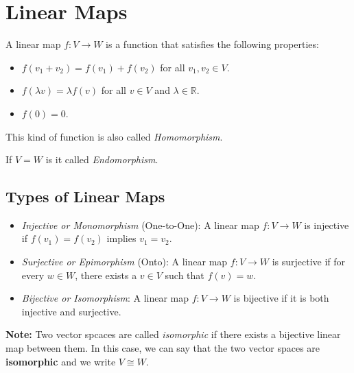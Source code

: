 \newpage
\section{Linear Maps}
A linear map \( f: V \to W \) is a function that satisfies the following properties:

\begin{itemize}[label=\(-\)]
    \item \( f(v_1 + v_2) = f(v_1) + f(v_2) \) for all \( v_1, v_2 \in V \).
    \item \( f(\lambda v) = \lambda f(v) \) for all \( v \in V \) and \( \lambda \in \mathbb{R} \).
    \item \( f(0) = 0 \).
\end{itemize} 

 This kind of function is also called \emph{Homomorphism}.

 If \(V = W\) is it called \emph{Endomorphism}.

\subsection{Types of Linear Maps}

\begin{itemize}[label=\(-\)]
    \item \emph{Injective or Monomorphism} (One-to-One): A linear map \( f: V \to W \) is injective if \( f(v_1) = f(v_2) \) implies \( v_1 = v_2 \).
    \item \emph{Surjective or Epimorphism} (Onto): A linear map \( f: V \to W \) is surjective if for every \( w \in W \), there exists a \( v \in V \) such that \( f(v) = w \).
    \item \emph{Bijective or Isomorphism}: A linear map \( f: V \to W \) is bijective if it is both injective and surjective.
\end{itemize}

\textbf{Note:} Two vector spcaces are called 
\emph{isomorphic} if there exists a bijective linear map between them. In this case, we can say that the two vector spaces are \textbf{isomorphic} and we write \( V \cong W \).

